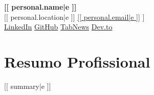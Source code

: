 \documentclass[a4paper,11pt]{article}
\begin{document}
\begin{center}
  {\Huge \textbf{[[ personal.name|e ]]}} \\[4pt]
  [[ personal.location|e ]] \quad 
  \href{mailto:[[ personal.email ]]}{[[ personal.email|e ]]} \quad 
  [[ personal.phone|e ]] \\[4pt]
  \href{https://[[ personal.linkedin_clean ]]}{LinkedIn} \quad
  \href{https://[[ personal.github_clean ]]}{GitHub} \quad
  \href{https://[[ personal.tabnews_clean ]]}{TabNews} \quad
  \href{https://[[ personal.devto_clean ]]}{Dev.to}
\end{center}
\vspace{8pt}


\section{Resumo Profissional}
\small{
  [[ summary|e ]]
}


\end{document}
